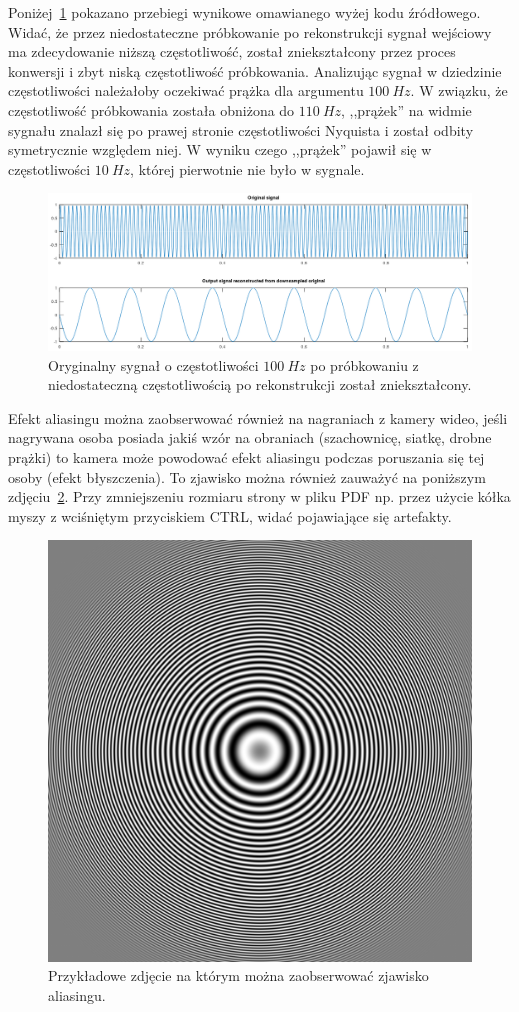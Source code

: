 Poniżej~\ref{lab4/fig/downsampledSignal} pokazano przebiegi wynikowe omawianego wyżej kodu źródłowego. Widać, że przez niedostateczne próbkowanie po rekonstrukcji sygnał wejściowy ma zdecydowanie niższą częstotliwość, został zniekształcony przez proces konwersji i zbyt niską częstotliwość próbkowania. Analizując sygnał w dziedzinie częstotliwości należałoby oczekiwać prążka dla argumentu $100~Hz$. W związku, że częstotliwość próbkowania została obniżona do $110~Hz$, ,,prążek'' na widmie sygnału znalazł się po prawej stronie częstotliwości Nyquista i został odbity symetrycznie względem niej. W wyniku czego ,,prążek'' pojawił się w częstotliwości $10~Hz$, której pierwotnie nie było w sygnale.

\begin{figure}[hbt!]
	\centering
	\includegraphics[width=0.95\linewidth]{images/downsampledSignal.png}
	\caption{Oryginalny sygnał o częstotliwości $100~Hz$ po próbkowaniu z niedostateczną częstotliwością po rekonstrukcji został zniekształcony.}
	\label{lab4/fig/downsampledSignal}
\end{figure}


Efekt aliasingu można zaobserwować również na nagraniach z kamery wideo, jeśli nagrywana osoba posiada jakiś wzór na obraniach (szachownicę, siatkę, drobne prążki) to kamera może powodować efekt aliasingu podczas poruszania się tej osoby (efekt błyszczenia). To zjawisko można również zauważyć na poniższym zdjęciu~\ref{lab4/fig/zonePlate}. Przy zmniejszeniu rozmiaru strony w pliku PDF np. przez użycie kółka myszy z wciśniętym przyciskiem CTRL, widać pojawiające się artefakty.
\begin{figure}[hbt!]
	\centering
	\includegraphics[width=0.5\linewidth]{images/zonePlate.png}
	\caption{Przykładowe zdjęcie na którym można zaobserwować zjawisko aliasingu.}
	\label{lab4/fig/zonePlate}
\end{figure}



